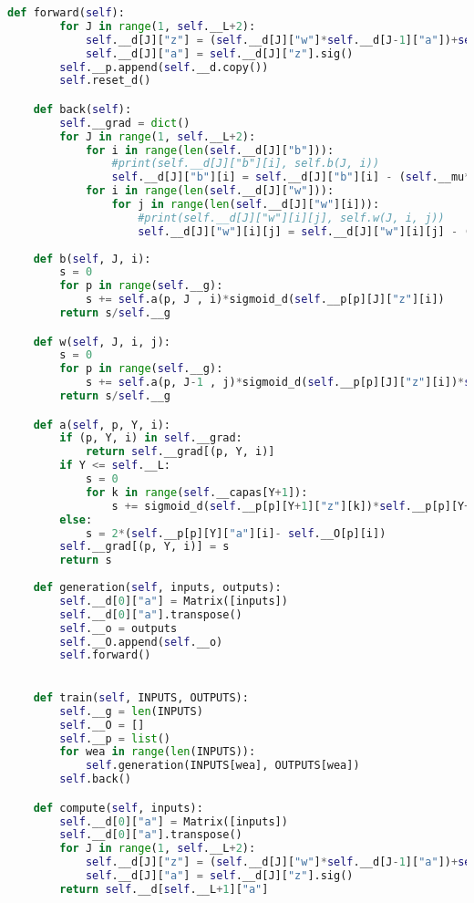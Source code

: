 \documentclass{article}
\begin{document}
\begin{lstlisting}[language=Python]
    def forward(self):
        for J in range(1, self.__L+2):
            self.__d[J]["z"] = (self.__d[J]["w"]*self.__d[J-1]["a"])+self.__d[J]["b"]
            self.__d[J]["a"] = self.__d[J]["z"].sig()
        self.__p.append(self.__d.copy())
        self.reset_d()

    def back(self):
        self.__grad = dict()
        for J in range(1, self.__L+2):
            for i in range(len(self.__d[J]["b"])):
                #print(self.__d[J]["b"][i], self.b(J, i))
                self.__d[J]["b"][i] = self.__d[J]["b"][i] - (self.__mu*self.b(J, i))
            for i in range(len(self.__d[J]["w"])):
                for j in range(len(self.__d[J]["w"][i])):
                    #print(self.__d[J]["w"][i][j], self.w(J, i, j))
                    self.__d[J]["w"][i][j] = self.__d[J]["w"][i][j] - (self.__mu*self.w(J, i, j))
    
    def b(self, J, i):
        s = 0
        for p in range(self.__g):
            s += self.a(p, J , i)*sigmoid_d(self.__p[p][J]["z"][i])
        return s/self.__g

    def w(self, J, i, j):
        s = 0
        for p in range(self.__g):
            s += self.a(p, J-1 , j)*sigmoid_d(self.__p[p][J]["z"][i])*self.__p[p][J-1]["a"][j]
        return s/self.__g

    def a(self, p, Y, i):
        if (p, Y, i) in self.__grad:
            return self.__grad[(p, Y, i)]
        if Y <= self.__L:
            s = 0
            for k in range(self.__capas[Y+1]):
                s += sigmoid_d(self.__p[p][Y+1]["z"][k])*self.__p[p][Y+1]["w"][k][i]*self.a(p, Y+1, k)
        else:
            s = 2*(self.__p[p][Y]["a"][i]- self.__O[p][i])
        self.__grad[(p, Y, i)] = s
        return s
    
    def generation(self, inputs, outputs):
        self.__d[0]["a"] = Matrix([inputs])
        self.__d[0]["a"].transpose()
        self.__o = outputs
        self.__O.append(self.__o)
        self.forward()
    

    def train(self, INPUTS, OUTPUTS):
        self.__g = len(INPUTS)
        self.__O = []
        self.__p = list()
        for wea in range(len(INPUTS)):
            self.generation(INPUTS[wea], OUTPUTS[wea])
        self.back()

    def compute(self, inputs):
        self.__d[0]["a"] = Matrix([inputs])
        self.__d[0]["a"].transpose()
        for J in range(1, self.__L+2):
            self.__d[J]["z"] = (self.__d[J]["w"]*self.__d[J-1]["a"])+self.__d[J]["b"]
            self.__d[J]["a"] = self.__d[J]["z"].sig()
        return self.__d[self.__L+1]["a"]


\end{lstlisting}
\end{document}
